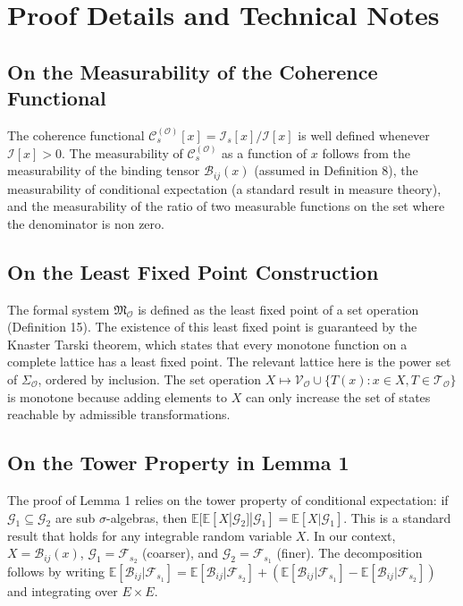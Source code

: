 \documentclass[12pt]{article}
\theoremstyle{definition}
\begin{document}
\appendix

\section{Proof Details and Technical Notes}

\subsection{On the Measurability of the Coherence Functional}
The coherence functional $\mathcal{C}_s^{(\mathcal{O})}[x] = \mathcal{I}_s[x] / \mathcal{I}[x]$ is well defined whenever $\mathcal{I}[x] > 0$. The measurability of $\mathcal{C}_s^{(\mathcal{O})}$ as a function of $x$ follows from the measurability of the binding tensor $\mathcal{B}_{ij}(x)$ (assumed in Definition 8), the measurability of conditional expectation (a standard result in measure theory), and the measurability of the ratio of two measurable functions on the set where the denominator is non zero.

\subsection{On the Least Fixed Point Construction}
The formal system $\mathfrak{M}_{\mathcal{O}}$ is defined as the least fixed point of a set operation (Definition 15). The existence of this least fixed point is guaranteed by the Knaster Tarski theorem, which states that every monotone function on a complete lattice has a least fixed point. The relevant lattice here is the power set of $\Sigma_{\mathcal{O}}$, ordered by inclusion. The set operation $X \mapsto \mathcal{V}_{\mathcal{O}} \cup \{T(x) : x \in X, T \in \mathcal{T}_{\mathcal{O}}\}$ is monotone because adding elements to $X$ can only increase the set of states reachable by admissible transformations.

\subsection{On the Tower Property in Lemma 1}
The proof of Lemma 1 relies on the tower property of conditional expectation: if $\mathcal{G}_1 \subseteq \mathcal{G}_2$ are sub $\sigma$-algebras, then $\mathbb{E}[\mathbb{E}[X | \mathcal{G}_2] | \mathcal{G}_1] = \mathbb{E}[X | \mathcal{G}_1]$. This is a standard result that holds for any integrable random variable $X$. In our context, $X = \mathcal{B}_{ij}(x)$, $\mathcal{G}_1 = \mathcal{F}_{s_2}$ (coarser), and $\mathcal{G}_2 = \mathcal{F}_{s_1}$ (finer). The decomposition follows by writing $\mathbb{E}[\mathcal{B}_{ij} | \mathcal{F}_{s_1}] = \mathbb{E}[\mathcal{B}_{ij} | \mathcal{F}_{s_2}] + (\mathbb{E}[\mathcal{B}_{ij} | \mathcal{F}_{s_1}] - \mathbb{E}[\mathcal{B}_{ij} | \mathcal{F}_{s_2}])$ and integrating over $E \times E$.
\end{document}

